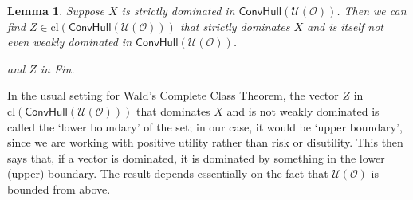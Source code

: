 \documentclass[a4paper]{article}
\newtheorem{lemma}[theorem]{Lemma}
\newcommand\cl{\mathrm{cl}}
\renewcommand\O{\mathcal{O}}
\newcommand\Uwald{\mathcal{U}} %
\newcommand{\todoold}[2][]{\todo[backgroundcolor=white,bordercolor=orange!10,linecolor=gray!10, #1,caption={},textcolor=gray]{Pre-rev: #2}}
\newcommand{\Conv}{\mathsf{ConvHull}}
\newenvironment{CCM rewritten}
{\begingroup\color{blue}} %
{\endgroup}              %
\begin{document}
	\begin{lemma}\label{thm:cct:dominator on boundry}
		Suppose $X$ is strictly  dominated in $\Conv(\Uwald(\O))$. Then we can find $Z\in\cl(\Conv(\Uwald(\O)))$ that strictly dominates $X$ and is itself not even weakly dominated in $\Conv(\Uwald(\O))$. \begin{infversion}
			and $Z$ in Fin.
		\end{infversion}
	\end{lemma}
	In the usual setting for Wald's Complete Class Theorem, the vector $Z$ in $\cl(\Conv(\Uwald(\O)))$ that dominates $X$ and is not weakly dominated is called the `lower boundary' of the set; in our case, it would be `upper boundary', since we are working with positive utility rather than risk or disutility. This then says that, if a vector is dominated, it is dominated by something in the lower (upper) boundary. The result depends essentially on the fact that $\Uwald(\O)$ is bounded from above. 
	
\end{document}
